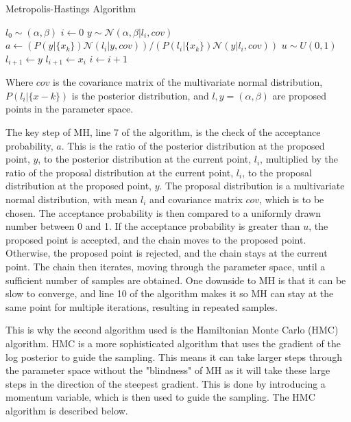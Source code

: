 \documentclass[12pt]{report} %
\begin{document}
\begin{definitionbox}{Metropolis-Hastings Algorithm}
    \begin{algorithmic}[1]
        \State $l_{0} \sim (\alpha, \beta)$ 
        \State $i \gets 0$
         
            \State $y \sim \mathcal{N}(\alpha, \beta | l_{i}, cov)$ 
            \State $a \gets (P(y|\{x_{k}\})\mathcal{N}(l_{i}|y, cov))/(P(l_{i}|\{x_{k}\})\mathcal{N}(y|l_{i}, cov))$ 
            \State $u \sim U(0, 1)$ 
                \State $l_{i+1} \gets y$ 
            \Else
                \State $l_{i+1} \gets x_{i}$ 
            \EndIf
            \State $i \gets i + 1$
        \EndWhile
        \end{algorithmic}
    Where $cov$ is the covariance matrix of the multivariate normal distribution, $P(l_{i}|\{x-{k}\})$ is the posterior distribution, and $l, y = (\alpha, \beta)$ are proposed points in the parameter space.
\end{definitionbox}

\vspace*{1\baselineskip}
The key step of MH, line 7 of the algorithm, is the check of the acceptance probability, $a$. This is the ratio of the posterior distribution at the proposed point, $y$, to the posterior distribution at the current point, $l_{i}$, multiplied by the ratio of the proposal distribution at the current point, $l_{i}$, to the proposal distribution at the proposed point, $y$. The proposal distribution is a multivariate normal distribution, with mean $l_{i}$ and covariance matrix $cov$, which is to be chosen. The acceptance probability is then compared to a uniformly drawn number between 0 and 1. If the acceptance probability is greater than $u$, the proposed point is accepted, and the chain moves to the proposed point. Otherwise, the proposed point is rejected, and the chain stays at the current point. The chain then iterates, moving through the parameter space, until a sufficient number of samples are obtained. One downside to MH is that it can be slow to converge, and line 10 of the algorithm makes it so MH can stay at the same point for multiple iterations, resulting in repeated samples.

This is why the second algorithm used is the Hamiltonian Monte Carlo (HMC) algorithm. HMC is a more sophisticated algorithm that uses the gradient of the log posterior to guide the sampling. This means it can take larger steps through the parameter space without the "blindness" of MH as it will take these large steps in the direction of the steepest gradient. This is done by introducing a momentum variable, which is then used to guide the sampling. The HMC algorithm is described below.
\end{document}
